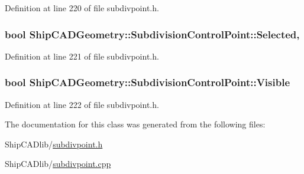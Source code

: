 Definition at line 220 of file subdivpoint.\-h.

\hypertarget{classShipCADGeometry_1_1SubdivisionControlPoint_a8ae4af44e0ff44086685a9b3a362dd43}{
\subsubsection[{Selected}]{\setlength{\rightskip}{0pt plus 5cm}bool Ship\-C\-A\-D\-Geometry\-::\-Subdivision\-Control\-Point\-::\-Selected\hspace{0.3cm}{\ttfamily [read]}, {\ttfamily [write]}}}\label{classShipCADGeometry_1_1SubdivisionControlPoint_a8ae4af44e0ff44086685a9b3a362dd43}


Definition at line 221 of file subdivpoint.\-h.

\hypertarget{classShipCADGeometry_1_1SubdivisionControlPoint_a1170db5bc9091fb18f6dfb3fd61d4413}{
\subsubsection[{Visible}]{\setlength{\rightskip}{0pt plus 5cm}bool Ship\-C\-A\-D\-Geometry\-::\-Subdivision\-Control\-Point\-::\-Visible\hspace{0.3cm}{\ttfamily [read]}}}\label{classShipCADGeometry_1_1SubdivisionControlPoint_a1170db5bc9091fb18f6dfb3fd61d4413}


Definition at line 222 of file subdivpoint.\-h.



The documentation for this class was generated from the following files\-:\begin{DoxyCompactItemize}
\item 
Ship\-C\-A\-Dlib/\hyperlink{subdivpoint_8h}{subdivpoint.\-h}\item 
Ship\-C\-A\-Dlib/\hyperlink{subdivpoint_8cpp}{subdivpoint.\-cpp}\end{DoxyCompactItemize}
